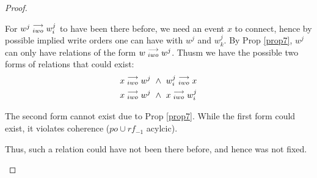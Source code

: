 \begin{proof}
\begin{itemize}
                For $w^j\stackrel{\longrightarrow}{_{iwo}}w_i^j$ to have been there before, we need an event $x$ to connect, hence by possible implied write orders one can have with $w^j$ and $w_k^j$. By Prop \ref{prop7}, $w^j$ can only have relations of the form $w\stackrel{\longrightarrow}{_{iwo}}w^j$. Thusm we have the possible two forms of relations that could exist:
                \begin{align*}
                    x\stackrel{\longrightarrow}{_{iwo}}w^j \ \wedge \ w_i^j\stackrel{\longrightarrow}{_{iwo}}x \\
                    x\stackrel{\longrightarrow}{_{iwo}}w^j \ \wedge \ x\stackrel{\longrightarrow}{_{iwo}}w_i^j \\ 
                \end{align*}

                The second form cannot exist due to Prop \ref{prop7}. While the first form could exist, it violates coherence ($po \cup rf_{-1}$ acylcic). 
                
                Thus, such a relation could have not been there before, and hence was not fixed. 

            \end{itemize}
            
        \end{proof}

        

   